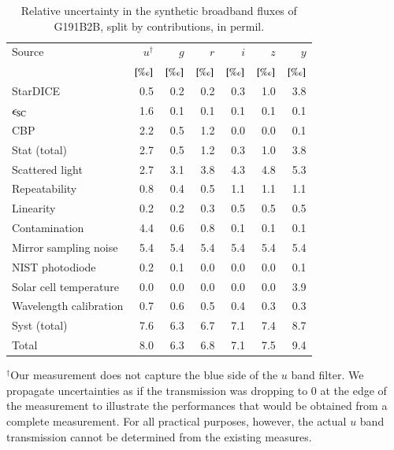 \begin{table}
  \centering
  \caption{Relative uncertainty in the synthetic broadband fluxes of
    G191B2B, split by contributions, in permil.}
  \label{tab:budget}
  \begin{tabular}{@{}l@{}rrrrrr@{}}
    \toprule
    Source & $u^\dag$ & $g$ & $r$ & $i$ & $z$ & $y$ \\
    & $[\text{\textperthousand}]$ & $[\text{\textperthousand}]$ & $[\text{\textperthousand}]$ & $[\text{\textperthousand}]$ & $[\text{\textperthousand}]$ & $[\text{\textperthousand}]$\\
    \midrule
    StarDICE & 0.5 & 0.2 & 0.2 & 0.3 & 1.0 & 3.8 \\
    $\epsilon_{\mathrm{SC}}$ & 1.6 & 0.1 & 0.1 & 0.1 & 0.1 & 0.1 \\
    CBP & 2.2 & 0.5 & 1.2 & 0.0 & 0.0 & 0.1 \\
    \midrule
    Stat (total) & 2.7 & 0.5 & 1.2 & 0.3 & 1.0 & 3.8 \\
    \midrule
    Scattered light & 2.7 & 3.1 & 3.8 & 4.3 & 4.8 & 5.3 \\
    Repeatability & 0.8 & 0.4 & 0.5 & 1.1 & 1.1 & 1.1 \\
    Linearity & 0.2 & 0.2 & 0.3 & 0.5 & 0.5 & 0.5 \\
    Contamination & 4.4 & 0.6 & 0.8 & 0.1 & 0.1 & 0.1 \\
    Mirror sampling noise & 5.4 & 5.4 & 5.4 & 5.4 & 5.4 & 5.4 \\
    NIST photodiode & 0.2 & 0.1 & 0.0 & 0.0 & 0.0 & 0.1 \\
    Solar cell temperature & 0.0 & 0.0 & 0.0 & 0.0 & 0.0 & 3.9 \\
    Wavelength calibration & 0.7 & 0.6 & 0.5 & 0.4 & 0.3 & 0.3 \\
    \midrule
    Syst (total) & 7.6 & 6.3 & 6.7 & 7.1 & 7.4 & 8.7 \\
    \midrule
    Total & 8.0 & 6.3 & 6.8 & 7.1 & 7.5 & 9.4 \\
    \bottomrule
  \end{tabular}

  \begin{tablenotes}
  \item $^\dag$Our measurement does not capture the blue side of the $u$ band filter. We propagate uncertainties as if the transmission was dropping to 0 at the edge of the measurement to illustrate the performances that would be obtained from a complete measurement. For all practical purposes, however, the actual $u$ band transmission cannot be determined from the existing measures.
  \end{tablenotes}

\end{table}


